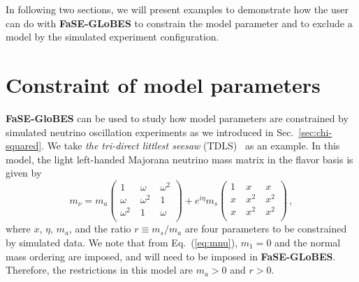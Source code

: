 \documentclass[aps,prd,nofootinbib,preprint]{revtex4}
\begin{document}
In following two sections, we will present examples to demonstrate how the user can do with \textbf{FaSE-GLoBES} to constrain the model parameter and to exclude a model by the simulated experiment configuration.

\section{Constraint of model parameters}

\textbf{FaSE-GloBES} can be used to study how model parameters are constrained by simulated neutrino oscillation experiments as we introduced in Sec.~\ref{sec:chi-squared}. We take \textit{the tri-direct littlest seesaw} (TDLS)~\cite{King:2013iva,King:2015dvf,King:2016yvg} as an example. In this model, the light left-handed Majorana neutrino mass matrix {\color{blue}in the flavor basis} is given by
\begin{equation}
\label{eq:mnu}  m_{\nu}=m_{a}\begin{pmatrix}
 1 &~ \omega  &~ \omega ^2 \\
 \omega  &~ \omega ^2 &~ 1 \\
 \omega ^2 &~ 1 &~ \omega  \\
\end{pmatrix}+e^{i\eta}m_{s}
\begin{pmatrix}
 1 &~  x &~  x \\
 x &~ x^2 &~ x^2 \\
 x &~ x^2 &~ x^2 \\
\end{pmatrix}\,,
\end{equation}
where $x$, $\eta$, $m_a$, and the ratio $r\equiv m_s/m_a$ are four parameters to be constrained by simulated data. We note that from Eq.~(\ref{eq:mnu}), $m_1=0$ and the normal mass ordering are imposed, and will need to be imposed in \textbf{FaSE-GLoBES}. Therefore, the restrictions in this model are $m_a>0$ and $r>0$.
\end{document}
